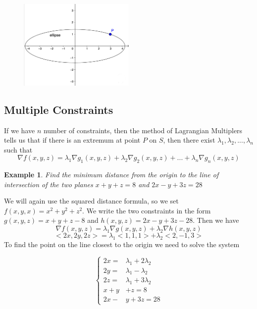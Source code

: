 \documentclass[]{article}
\newtheorem{example}{Example}
\begin{document}
\begin{figure}[h]
    \centering
    \includegraphics[width=0.50\textwidth]{example2.png}
\end{figure}



\subsection{Multiple Constraints}
If we have $n$ number of constraints, then the method of Lagrangian Multiplers tells us that if there is an extremum at point $P$ on $S$, then there exist $\lambda_1,\lambda_2,...,\lambda_n$ such that
$$
    \nabla f(x,y,z) = \lambda_1 \nabla g_1(x,y,z) + \lambda_2 \nabla g_2(x,y,z) + ... + \lambda_n \nabla g_n(x,y,z)
$$

\begin{example}
    Find the minimum distance from the origin to the line of intersection of the two planes $x+y+z=8$ and $2x-y+3z=28$ 
\end{example}

We will again use the squared distance formula, so we set $f(x,y,x)=x^2+y^2+z^2$. We write the two constraints in the form $g(x,y,z)=x+y+z-8$ and $h(x,y,z)=2x-y+3z-28$. Then we have
$$
    \nabla f(x,y,z) = \lambda_1 \nabla g(x,y,z) + \lambda_2 \nabla h(x,y,z)
$$
$$
    <2x,2y,2z> = \lambda_1<1,1,1> + \lambda_2<2,-1,3>
$$
To find the point on the line closest to the origin we need to solve the system

\begin{equation*}
    \left\{
    \begin{alignedat}{3}
        2x= & \lambda_1 + 2\lambda_2 \\
        2y= &  \lambda_1 - \lambda_2 \\
        2z= &  \lambda_1 + 3\lambda_2 \\
        x+y & +z=8 \\
        2x - & y +3z = 28
    \end{alignedat}
    \right.
\end{equation*}
\end{document}
